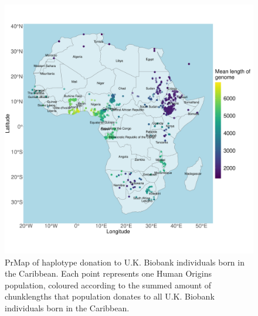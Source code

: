 \begin{figure}[htp]
    \centering
    \includegraphics[width=1.0\textwidth]{../images/appendix/haplotype_map_Caribbean.pdf}
    \caption{PrMap of haplotype donation to U.K. Biobank individuals born in the Caribbean. Each point represents one Human Origins population, coloured according to the summed amount of chunklengths that population donates to all U.K. Biobank individuals born in the Caribbean.}
    \label{fig:haplotype_map_Caribbean}
\end{figure}

